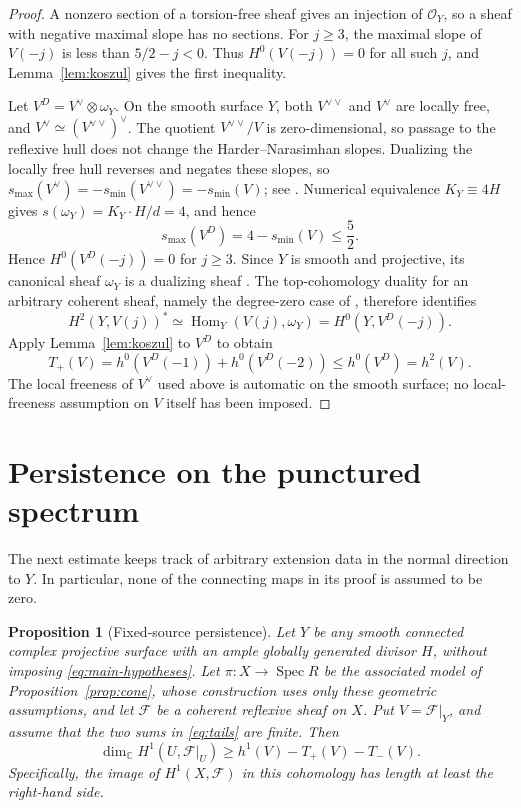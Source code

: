 \documentclass[11pt,reqno]{amsart}
\numberwithin{equation}{section}
\newtheorem{proposition}[theorem]{Proposition}
\theoremstyle{definition}
\theoremstyle{remark}
\newcommand{\C}{\mathbb C}
\newcommand{\OO}{\mathcal O}
\newcommand{\FF}{\mathcal F}
\newcommand{\Spec}{\operatorname{Spec}}
\newcommand{\smax}{s_{\max}}
\newcommand{\smin}{s_{\min}}
\newcommand{\Hom}{\operatorname{Hom}}
\begin{document}
\begin{proof}
A nonzero section of a torsion-free sheaf gives an injection of
$\OO_Y$, so a sheaf with negative maximal slope has no sections.
For $j\geq3$, the maximal slope of $V(-j)$ is less than $5/2-j<0$.
Thus $H^0(V(-j))=0$ for all such $j$, and
Lemma~\ref{lem:koszul} gives the first inequality.

Let $V^D=V^\vee\otimes\omega_Y$.
On the smooth surface $Y$, both $V^{\vee\vee}$ and $V^\vee$ are
locally free, and $V^\vee\simeq(V^{\vee\vee})^\vee$.
The quotient $V^{\vee\vee}/V$ is zero-dimensional, so passage to the
reflexive hull does not change the Harder--Narasimhan slopes.
Dualizing the locally free hull reverses and negates these slopes, so
$\smax(V^\vee)=-\smin(V^{\vee\vee})=-\smin(V)$;
see \cite[Sections 1.1 and 1.6]{HuybrechtsLehn2010}.
Numerical equivalence $K_Y\equiv4H$ gives
$s(\omega_Y)=K_Y\cdot H/d=4$, and hence
\[
 \smax(V^D)=4-\smin(V)\leq\frac52.
\]
Hence $H^0(V^D(-j))=0$ for $j\geq3$.
Since $Y$ is smooth and projective, its canonical sheaf $\omega_Y$
is a dualizing sheaf \cite[Chapter III, Corollary 7.12]{Hartshorne1977}.
The top-cohomology duality for an arbitrary coherent sheaf, namely
the degree-zero case of \cite[Chapter III, Theorem 7.6]{Hartshorne1977},
therefore identifies
\[
 H^2(Y,V(j))^*\simeq
 \Hom_Y(V(j),\omega_Y)=H^0(Y,V^D(-j)).
\]
Apply Lemma~\ref{lem:koszul} to $V^D$ to obtain
\[
 T_+(V)=h^0(V^D(-1))+h^0(V^D(-2))
       \leq h^0(V^D)=h^2(V).
\]
The local freeness of $V^\vee$ used above is automatic on the smooth
surface; no local-freeness assumption on $V$ itself has been imposed.
\end{proof}

\section{Persistence on the punctured spectrum}\label{sec:persistence}

The next estimate keeps track of arbitrary extension data in the
normal direction to $Y$. In particular, none of the connecting maps
in its proof is assumed to be zero.

\begin{proposition}[Fixed-source persistence]\label{prop:persistence}
Let $Y$ be any smooth connected complex projective surface with an
ample globally generated divisor $H$, without imposing
\eqref{eq:main-hypotheses}. Let $\pi:X\to\Spec R$ be the associated
model of Proposition~\ref{prop:cone}, whose construction uses only
these geometric assumptions, and let $\FF$ be a coherent reflexive
sheaf on $X$. Put $V=\FF|_Y$, and assume that the two sums in
\eqref{eq:tails} are finite. Then
\begin{equation}\label{eq:persistence}
 \dim_\C H^1(U,\FF|_U)
 \geq h^1(V)-T_+(V)-T_-(V).
\end{equation}
Specifically, the image of $H^1(X,\FF)$ in this cohomology has
length at least the right-hand side.
\end{proposition}
\end{document}
